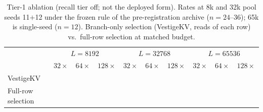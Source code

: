 \begin{table}[H]
\centering
\caption{Tier-1 ablation (recall tier off; not the deployed form). Rates at
8k and 32k pool seeds 11$+$12 under the frozen rule of the pre-registration
archive ($n{=}24$--$36$); 65k is single-seed ($n{=}12$).
Branch-only selection (VestigeKV, reads \readCost{} of each row) vs.\
full-row selection at matched budget.}
\label{tab:main}
\footnotesize
\begin{tabular}{lccccccccc}
\toprule
 & \multicolumn{3}{c}{$L{=}8192$} & \multicolumn{3}{c}{$L{=}32768$} & \multicolumn{3}{c}{$L{=}65536$}\\
 & $32\times$ & $64\times$ & $128\times$ & $32\times$ & $64\times$ & $128\times$ & $32\times$ & $64\times$ & $128\times$\\
\midrule
VestigeKV & \vkEightKxThirtyTwo & \vkEightKxSixtyFour & \vkEightKxOTE & \vkThirtyTwoKxThirtyTwo & \vkThirtyTwoKxSixtyFour & \vkThirtyTwoKxOTE & \vkSixtyFiveKxThirtyTwo & \vkSixtyFiveKxSixtyFour & \vkSixtyFiveKxOTE\\
Full-row selection & \fullEightKxThirtyTwo & \fullEightKxSixtyFour & \fullEightKxOTE & \fullThirtyTwoKxThirtyTwo & \fullThirtyTwoKxSixtyFour & \fullThirtyTwoKxOTE & \fullSixtyFiveKxThirtyTwo & \fullSixtyFiveKxSixtyFour & \fullSixtyFiveKxOTE\\
\bottomrule
\end{tabular}
\end{table}